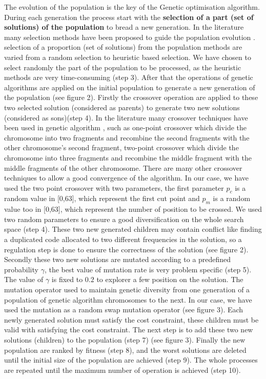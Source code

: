 \documentclass[preprint,12pt]{elsarticle}
\begin{document}
The evolution of the population is the key of the Genetic optimisation algorithm. During each generation the process start with the \textbf{selection of a part (set of solutions) of the population} to bread a new generation. In the literature many selection methods have been proposed to guide the population evolution \cite{bli95}. selection of a proportion (set of solutions) from the population  methods are varied from a random selection to heuristic based selection. We have chosen to select randomly the part of the population to be processed, as the heuristic methods are very time-consuming (step 3).
After that the operations of genetic algorithms are applied on the initial population to generate a new generation of the population (see figure 2). Firstly the crossover operation are applied to these two selected solution (considered as parents) to generate two new solutions (considered as sons)(step 4). In the literature many crossover techniques have been used in genetic algorithm \cite{osa14}, such as one-point crossover which divide the chromosome into two fragments and recombine the second fragments with the other chromosome's second fragment, two-point crossover which divide the chromosome into three fragments and recombine the middle fragment with  the middle fragments of the other chromosome. There are many other crossover techniques to allow a good convergence of the algorithm. In our case, we have used the two point crossover with two parameters, the first parameter $p_{c}$ is a random value in [0,63], which represent the first cut point and $p_{m}$ is a random value too in [0,63], which represent the number of position to be crossed. We used two random parameters to ensure a good diversification on the whole search space (step 4).
These two new generated children may contain conflict like finding a duplicated code allocated to two different frequencies in the solution, so a regulation step is done to ensure the correctness of the solution (see figure 2).
 Secondly these two new solutions are mutated according to a predefined probability $\gamma$, the best value of mutation rate is very problem specific (step 5). The value of $\gamma$ is fixed to $0.2$ to explorer a few position on the solution. The mutation operator used to maintain genetic diversity from one generation of a population of genetic algorithm chromosomes to the next. In our case, we have used the mutation as a random swap mutation operator (see figure 3).  Each newly generated solution must satisfy the cost constraint, these children must be valid with satisfying the cost constraint. The next step is to add these two new solutions (children) to the population (step 7) (see figure 3). Finally the new population are ranked by fitness (step 8), and the worst solutions are deleted until the initial size of the population are achieved  (step 9). The whole processes are repeated until the maximum number of operation is achieved (step 10). 
\end{document}
